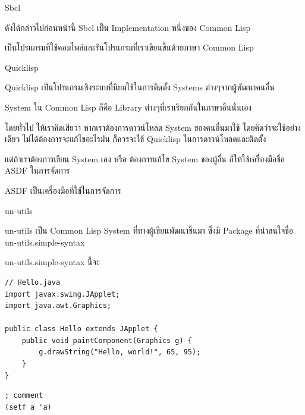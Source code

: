 \documentclass[a4paper]{article}
\begin{document}
Sbcl

ดังได้กล่าวไปก่อนหน้านี้ Sbcl เป็น Implementation หนึ่งของ Common Lisp

เป็นโปรแกรมที่ใช้คอมไพล์และรันโปรแกรมที่เราเขียนขึ้นด้วยภาษา Common Lisp

Quicklisp

Quicklisp เป็นโปรแกรมเชิงระบบที่นิยมใช้ในการติดตั้ง Systems ต่างๆจากผู้พัฒนาคนอื่น

System ใน Common Lisp ก็คือ Library ต่างๆที่เราเรียกกันในภาษาอื่นนั่นเอง

โดยทั่วไป ให้เราคิดเสียว่า หากเราต้องการดาวน์โหลด System ของคนอื่นมาใช้
โดยคิดว่าจะใช้อย่างเดียว ไม่ได้ต้องการจะแก้ไขอะไรมัน ก็ควรจะใช้ Quicklisp
ในการดาวน์โหลดและติดตั้ง

แต่ถ้าเราต้องการเขียน System เอง หรือ ต้องการแก้ไข System ของผู้อื่น ก็ให้ใช้เครื่องมือชื่อ
ASDF ในการจัดการ

ASDF เป็นเครื่องมือที่ใช้ในการจัดการ

un-utils

un-utils เป็น Common Lisp System ที่ทางผู้เขียนพัฒนาขึ้นมา ซึ่งมี Package ที่น่าสนใจชื่อ
un-utils.simple-syntax

un-utils.simple-syntax นี้จะ

\lstset{language=Java}
\begin{lstlisting}
// Hello.java
import javax.swing.JApplet;
import java.awt.Graphics;

public class Hello extends JApplet {
    public void paintComponent(Graphics g) {
        g.drawString("Hello, world!", 65, 95);
    }    
}
\end{lstlisting}

\lstset{language=Lisp}
\begin{lstlisting}
; comment
(setf a 'a)
\end{lstlisting}
\end{document}
